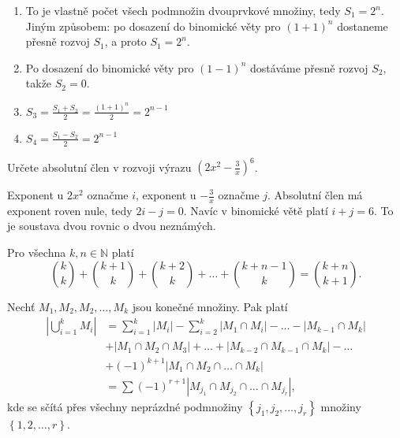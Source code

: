 \begin{reseni}
\begin{enumerate}[$i.$]
\item To je vlastně počet všech podmnožin dvouprvkové množiny, tedy $S_1=2^n$. Jiným
způsobem: po dosazení do binomické věty pro $(1+1)^n$ dostaneme přesně rozvoj $S_1$,
a proto $S_1=2^n.$
\item Po dosazení do binomické věty pro $(1-1)^n$ dostáváme přesně rozvoj $S_2$,
takže $S_2=0.$
\item $S_3=\frac{S_1+S_2}{2}=\frac{(1+1)^n}{2}=2^{n-1}$
\item $S_4=\frac{S_1-S_2}{2}=2^{n-1}$
\end{enumerate}
\end{reseni}

\begin{priklad}
Určete absolutní člen v rozvoji výrazu $(2x^2-\frac{3}{x})^6$.
\end{priklad}

\begin{reseni}
Exponent u $2x^2$ označme $i$, exponent u $-\frac{3}{x}$ označme $j$. Absolutní člen má
exponent roven nule, tedy $2i-j=0$. Navíc v binomické větě platí $i+j=6$. To je
soustava dvou rovnic o dvou neznámých.
\end{reseni}

\begin{veta}
    Pro všechna $k,n \in \mathbb N$ platí
    $$\binom{k}{k} + \binom{k+1}{k}+\binom{k+2}{k}+\dots + \binom{k+n-1}{k}=
    \binom{k+n}{k+1}.$$
\end{veta}

\begin{veta}
    Nechť $M_1, M_2, M_2, \dots, M_k$ jsou konečné množiny. Pak platí
    \begin{align*}
        \left | \bigcup_{i=1}^k M_i \right | &= \sum_{i=1}^k \left | M_i \right |
        - \sum_{i=2}^k \left | M_1 \cap M_i \right | - \dots
        - \left | M_{k-1}\cap M_k \right | \\
        &+ \left | M_1\cap M_2 \cap M_3 \right | + \dots +
        \left | M_{k-2}\cap M_{k-1} \cap M_k \right | - \dots \\
        & + (-1)^{k+1} \left | M_1\cap M_2 \cap \dots \cap M_k \right |\\
        &= \sum (-1)^{r+1} \left | M_{j_1}\cap M_{j_2} \cap \dots \cap M_{j_r} \right |,
    \end{align*}
    kde se sčítá přes všechny neprázdné podmnožiny $\left \{ j_1, j_2, \dots,
   j_r \right \} $ množiny $\left \{ 1,2,\dots, r \right \}$.
\end{veta}

